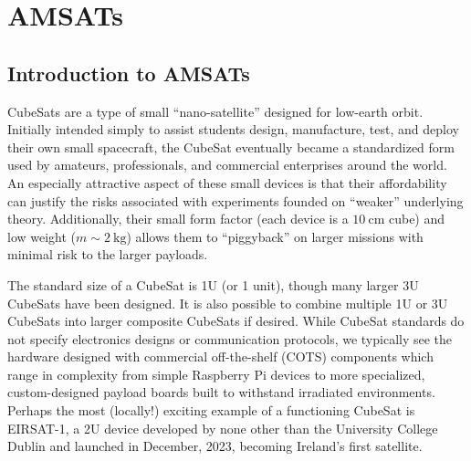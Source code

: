 \documentclass{tufte-book}
\begin{document}



\chapter{AMSATs}


\section{Introduction to AMSATs}


CubeSats are a type of small ``nano-satellite'' designed for low-earth orbit. Initially intended simply to assist students design, manufacture, test, and deploy their own small spacecraft, the CubeSat eventually became a standardized form used by amateurs, professionals, and commercial enterprises around the world. An especially attractive aspect of these small devices is that their affordability can justify the risks associated with experiments founded on ``weaker'' underlying theory. Additionally, their small form factor (each device is a $10~\mathrm{cm}$ cube) and low weight ($m \sim 2~\mathrm{kg}$) allows them to ``piggyback'' on larger missions with minimal risk to the larger payloads. 

The standard size of a CubeSat is 1U (or 1 unit), though many larger 3U CubeSats have been designed. It is also possible to combine multiple 1U or 3U CubeSats into larger composite CubeSats if desired. While CubeSat standards do not specify electronics designs or communication protocols, we typically see the hardware designed with commercial off-the-shelf (COTS) components which range in complexity from simple Raspberry Pi devices to more specialized, custom-designed payload boards built to withstand irradiated environments. Perhaps the most (locally!) exciting example of a functioning CubeSat is EIRSAT-1, a 2U device developed by none other than the University College Dublin and launched in December, 2023, becoming Ireland's first satellite.
\end{document}
